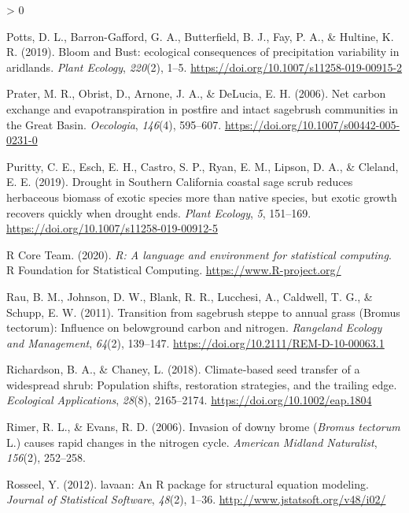 \documentclass[
  11pt,
  a4paper,
]{article}
\newlength{\cslhangindent}
\newenvironment{CSLReferences}[2] %
 {%
  \setlength{\parindent}{0pt}
  \ifodd #1 \everypar{\setlength{\hangindent}{\cslhangindent}}\ignorespaces\fi
  \ifnum #2 > 0
  \setlength{\parskip}{#2\baselineskip}
  \fi
 }%
 {}
\begin{document}
\begin{CSLReferences}{1}{0}
\leavevmode\hypertarget{ref-Potts2019}{}%
Potts, D. L., Barron-Gafford, G. A., Butterfield, B. J., Fay, P. A., \& Hultine, K. R. (2019). {Bloom and Bust: ecological consequences of precipitation variability in aridlands}. \emph{Plant Ecology}, \emph{220}(2), 1--5. \url{https://doi.org/10.1007/s11258-019-00915-2}

\leavevmode\hypertarget{ref-Prater2006}{}%
Prater, M. R., Obrist, D., Arnone, J. A., \& DeLucia, E. H. (2006). {Net carbon exchange and evapotranspiration in postfire and intact sagebrush communities in the Great Basin}. \emph{Oecologia}, \emph{146}(4), 595--607. \url{https://doi.org/10.1007/s00442-005-0231-0}

\leavevmode\hypertarget{ref-Puritty2019}{}%
Puritty, C. E., Esch, E. H., Castro, S. P., Ryan, E. M., Lipson, D. A., \& Cleland, E. E. (2019). {Drought in Southern California coastal sage scrub reduces herbaceous biomass of exotic species more than native species, but exotic growth recovers quickly when drought ends}. \emph{Plant Ecology}, \emph{5}, 151--169. \url{https://doi.org/10.1007/s11258-019-00912-5}

\leavevmode\hypertarget{ref-R}{}%
R Core Team. (2020). \emph{R: A language and environment for statistical computing}. R Foundation for Statistical Computing. \url{https://www.R-project.org/}

\leavevmode\hypertarget{ref-Rau2011}{}%
Rau, B. M., Johnson, D. W., Blank, R. R., Lucchesi, A., Caldwell, T. G., \& Schupp, E. W. (2011). {Transition from sagebrush steppe to annual grass (Bromus tectorum): Influence on belowground carbon and nitrogen}. \emph{Rangeland Ecology and Management}, \emph{64}(2), 139--147. \url{https://doi.org/10.2111/REM-D-10-00063.1}

\leavevmode\hypertarget{ref-Richardson2018}{}%
Richardson, B. A., \& Chaney, L. (2018). Climate‐based seed transfer of a widespread shrub: Population shifts, restoration strategies, and the trailing edge. \emph{Ecological Applications}, \emph{28}(8), 2165--2174. \url{https://doi.org/10.1002/eap.1804}

\leavevmode\hypertarget{ref-Rimer2006}{}%
Rimer, R. L., \& Evans, R. D. (2006). {Invasion of downy brome (\emph{Bromus tectorum} L.) causes rapid changes in the nitrogen cycle}. \emph{American Midland Naturalist}, \emph{156}(2), 252--258.

\leavevmode\hypertarget{ref-Rosseel2012}{}%
Rosseel, Y. (2012). {lavaan}: An {R} package for structural equation modeling. \emph{Journal of Statistical Software}, \emph{48}(2), 1--36. \url{http://www.jstatsoft.org/v48/i02/}


\end{CSLReferences}
\end{document}

